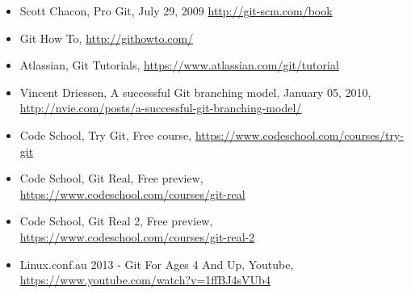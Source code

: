 \documentclass[12pt]{article}
\begin{document}
   \begin{itemize}
      \item Scott Chacon, Pro Git, July 29, 2009 \url{http://git-scm.com/book}
      \item Git How To,  \url{http://githowto.com/}
      \item Atlassian, Git Tutorials,  \url{https://www.atlassian.com/git/tutorial}
      \item Vincent Driessen, A successful Git branching model, January 05, 2010,  \url{http://nvie.com/posts/a-successful-git-branching-model/}
      \item Code School, Try Git, Free course,  \url{https://www.codeschool.com/courses/try-git}
      \item  Code School, Git Real, Free preview,  \url{https://www.codeschool.com/courses/git-real}
      \item Code School, Git Real 2, Free preview,  \url{https://www.codeschool.com/courses/git-real-2}
      \item Linux.conf.au 2013 - Git For Ages 4 And Up, Youtube,  \url{https://www.youtube.com/watch?v=1ffBJ4sVUb4}
   \end{itemize}
\end{document}
